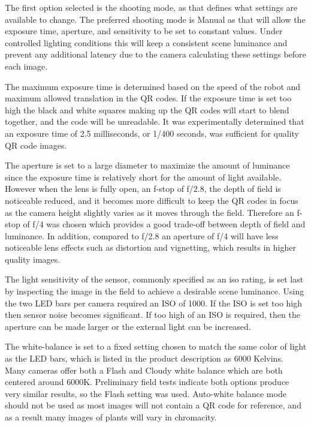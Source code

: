 The first option selected is the shooting mode, as that defines what settings are available to change.  The preferred shooting mode is Manual as that will allow the exposure time, aperture, and sensitivity to be set to constant values.  Under controlled lighting conditions this will keep a consistent scene luminance and prevent any additional latency due to the camera calculating these settings before each image.

The maximum exposure time is determined based on the speed of the robot and maximum allowed translation in the QR codes.  If the exposure time is set too high the black and white squares making up the QR codes will start to blend together, and the code will be unreadable.  It was experimentally determined that an exposure time of 2.5 milliseconds, or 1/400 seconds, was sufficient for quality QR code images.

The aperture is set to a large diameter to maximize the amount of luminance since the exposure time is relatively short for the amount of light available.  However when the lens is fully open, an f-stop of f/2.8, the depth of field is noticeable reduced, and it becomes more difficult to keep the QR codes in focus as the camera height slightly varies as it moves through the field.  Therefore an f-stop of f/4 was chosen which provides a good trade-off between depth of field and luminance.  In addition, compared to f/2.8 an aperture of f/4 will have less noticeable lens effects such as distortion and vignetting, which results in higher quality images.  

The light sensitivity of the sensor, commonly specified as an \ac{iso} rating, is set last by inspecting the image in the field to achieve a desirable scene luminance.  Using the two LED bars per camera required an ISO of 1000.  If the ISO is set too high then sensor noise becomes significant.  If too high of an ISO is required, then the aperture can be made larger or the external light can be increased.  

The white-balance is set to a fixed setting chosen to match the same color of light as the LED bars, which is listed in the product description as 6000 Kelvins.  Many cameras offer both a Flash and Cloudy white balance which are both centered around 6000K.   Preliminary field tests indicate both options produce very similar results, so the Flash setting was used.  Auto-white balance mode should not be used as most images will not contain a QR code for reference, and as a result many images of plants will vary in chromacity. 

